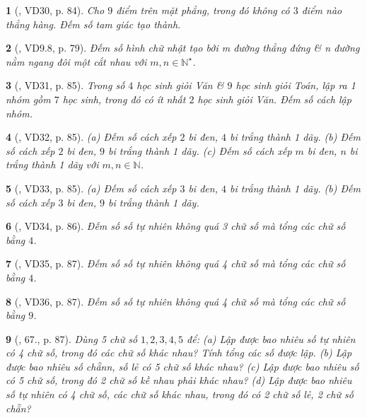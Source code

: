 \documentclass{article}
\newtheorem{baitoan}{}
\begin{document}
\begin{baitoan}[\cite{Binh_Toan_6_tap_2}, VD30, p. 84]
	Cho $9$ điểm trên mặt phẳng, trong đó không có $3$ điểm nào thẳng hàng. Đếm số tam giác tạo thành.
\end{baitoan}

\begin{baitoan}[\cite{TLCT_THCS_Toan_6_hinh_hoc}, VD9.8, p. 79]
	Đếm số hình chữ nhật tạo bởi m đường thẳng đứng \& n đường nằm ngang đôi một cắt nhau với $m,n\in\mathbb{N}^\star$.
\end{baitoan}

\begin{baitoan}[\cite{Binh_Toan_6_tap_2}, VD31, p. 85]
	Trong số $4$ học sinh giỏi Văn \& $9$ học sinh giỏi Toán, lập ra 1 nhóm gồm $7$ học sinh, trong đó có ít nhất $2$ học sinh giỏi Văn. Đếm số cách lập nhóm.
\end{baitoan}

\begin{baitoan}[\cite{Binh_Toan_6_tap_2}, VD32, p. 85]
	(a) Đếm số cách xếp $2$ bi đen, $4$ bi trắng thành 1 dãy. (b) Đếm số cách xếp $2$ bi đen, $9$ bi trắng thành 1 dãy. (c) Đếm số cách xếp $m$ bi đen, $n$ bi trắng thành 1 dãy với $m,n\in\mathbb{N}$.
\end{baitoan}

\begin{baitoan}[\cite{Binh_Toan_6_tap_2}, VD33, p. 85]
	(a) Đếm số cách xếp $3$ bi đen, $4$ bi trắng thành 1 dãy. (b) Đếm số cách xếp $3$ bi đen, $9$ bi trắng thành 1 dãy. 
\end{baitoan}

\begin{baitoan}[\cite{Binh_Toan_6_tap_2}, VD34, p. 86]
	Đếm số số tự nhiên không quá 3 chữ số mà tổng các chữ số bằng $4$.
\end{baitoan}

\begin{baitoan}[\cite{Binh_Toan_6_tap_2}, VD35, p. 87]
	Đếm số số tự nhiên không quá 4 chữ số mà tổng các chữ số bằng $4$.
\end{baitoan}

\begin{baitoan}[\cite{Binh_Toan_6_tap_2}, VD36, p. 87]
	Đếm số số tự nhiên không quá 4 chữ số mà tổng các chữ số bằng $9$.
\end{baitoan}

\begin{baitoan}[\cite{Binh_Toan_6_tap_2}, 67., p. 87]
	Dùng 5 chữ số $1,2,3,4,5$ để: (a) Lập được bao nhiêu số tự nhiên có 4 chữ số, trong đó các chữ số khác nhau? Tính tổng các số được lập. (b) Lập được bao nhiêu số chẵnn, số lẻ có 5 chữ số khác nhau? (c) Lập được bao nhiêu số có 5 chữ số, trong đó 2 chữ số kề nhau phải khác nhau? (d) Lập được bao nhiêu số tự nhiên có 4 chữ số, các chữ số khác nhau, trong đó có 2 chữ số lẻ, 2 chữ số chẵn?
\end{baitoan}
\end{document}
